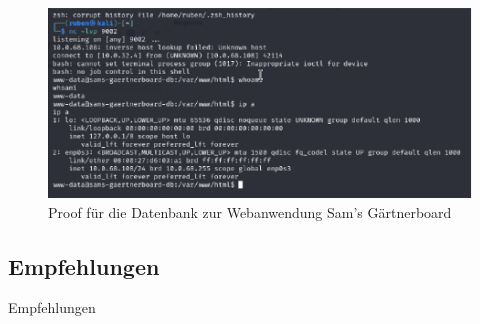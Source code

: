 \begin{figure}[!ht]
    \centering
    \includegraphics[width=\linewidth]{images/proofs/03_sam_db_proof.png}
    \caption{Proof für die Datenbank zur Webanwendung Sam's Gärtnerboard}
    \label{fig:03_sam_db_proof}
\end{figure}

\subsection*{Empfehlungen}
Empfehlungen
